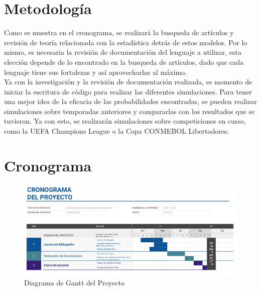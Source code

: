 \begin{titlepage}



\section{Metodología}

Como se muestra en el cronograma, se realizará la busqueda de artículos y revisión de teoría relacionada con la estadística detrás de estos modelos. Por lo mismo, es necesaria la revisión de documentación del lenguaje a utilizar, esta elección depende de lo encontrado en la busqueda de artículos, dado que cada lenguaje tiene sus fortalezas y así aprovecharlas al máximo. \\


Ya con la investigación y la revisión de documentación realizada, es momento de iniciar la escritura de código para realizar las diferentes simulaciones. Para tener una mejor idea de la eficacia de las probabilidades encontradas, se pueden realizar simulaciones sobre temporadas anteriores y compararlas con los resultados que se tuvieron. Ya con esto, se realizarán simulaciones sobre competiciones en curso, como la UEFA Champions League o la Copa CONMEBOL Libertadores. \\




\section{Cronograma}


\begin{figure}[H]
	\centering
	\includegraphics[scale=0.35]{./img/diagramaGantt.png}
	\caption{Diagrama de Gantt del Proyecto}
	\label{gantt}
\end{figure}



\end{titlepage}
